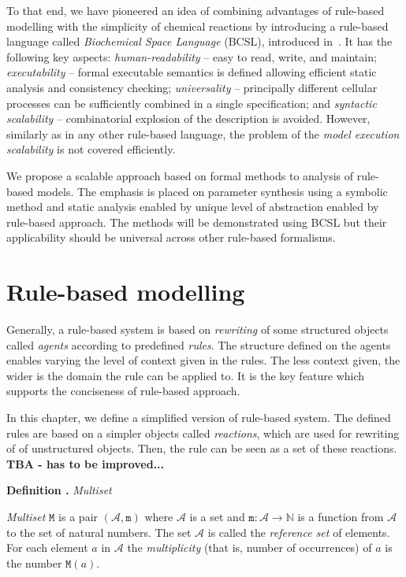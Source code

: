 \documentclass[11pt,a4paper]{report}
\newcounter{counter}[section]
\renewcommand{\thecounter}{\thechapter.\arabic{counter}}
\newenvironment{definition}[1]{\bigskip\refstepcounter{counter}\noindent\textbf{Definition \thecounter } \emph{#1} \par\nopagebreak\noindent \begin{itshape}}{\end{itshape}\bigskip}
\begin{document}
To that end, we have pioneered an idea of combining advantages of rule-based modelling with the simplicity of chemical reactions by introducing a rule-based language called \emph{Biochemical Space Language} (BCSL), introduced in~\cite{Ded201627}. It has the following key aspects: \emph{human-readability} -- easy to read, write, and maintain;
\emph{executability} -- formal executable semantics is defined allowing
efficient static analysis and consistency checking; \emph{universality} -- principally different cellular processes can be sufficiently combined in a single specification; and \emph{syntactic scalability} -- combinatorial explosion of the description is avoided. However, similarly as in any other rule-based language, the problem of the \emph{model execution scalability} is not covered efficiently.

We propose a scalable approach based on formal methods to analysis of rule-based models. The emphasis is placed on parameter synthesis using a symbolic method and static analysis enabled by unique level of abstraction enabled by rule-based approach. The methods will be demonstrated using BCSL but their applicability should be universal across other rule-based formalisms.

\chapter{Rule-based modelling}
\label{formal}

Generally, a rule-based system is based on \emph{rewriting} of some structured objects called \emph{agents} according to predefined \emph{rules}. The structure defined on the agents enables varying the level of context given in the rules. The less context given, the wider is the domain the rule can be applied to. It is the key feature which supports the conciseness of rule-based approach.

In this chapter, we define a simplified version of rule-based system. The defined rules are based on a simpler objects called \emph{reactions}, which are used for rewriting of of unstructured objects. Then, the rule can be seen as a set of these reactions. \textbf{TBA - has to be improved...}

\begin{definition}{Multiset}
\emph{Multiset} $\mathtt{M}$ is a pair $(\mathcal{A}, \mathtt{m})$ where $\mathcal{A}$ is a set and $ \mathtt{m} : \mathcal{A} \rightarrow \mathbb{N} $ is a function from $\mathcal{A}$ to the set of natural numbers. The set $\mathcal{A}$ is called the \emph{reference set} of elements. For each element $\mathit{a}$ in $\mathcal{A}$ the \emph{multiplicity} (that is, number of occurrences) of $\mathit{a}$ is the number $\mathtt{M}(\mathit{a})$.
\end{definition}
\end{document}
